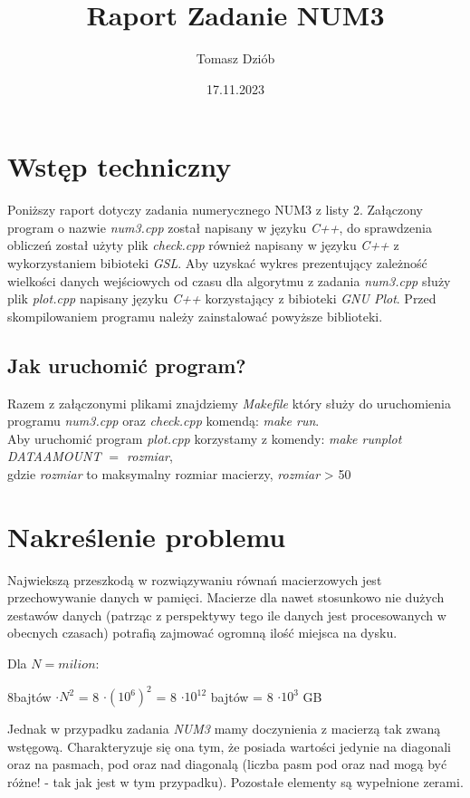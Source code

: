 \documentclass{article}
\title{Raport Zadanie NUM3}
\date{17.11.2023}
\author{Tomasz Dziób}
\begin{document}
  \maketitle
  \newpage
  \section{Wstęp techniczny}
  Poniższy raport dotyczy zadania numerycznego NUM3 z listy 2. Załączony program o nazwie \textit{num3.cpp} został napisany w języku \textit{C++}, do sprawdzenia obliczeń został użyty plik \textit{check.cpp} również napisany w języku \textit{C++} z wykorzystaniem bibioteki \textit{GSL}. Aby uzyskać wykres prezentujący zależność wielkości danych wejściowych od czasu dla algorytmu z zadania \textit{num3.cpp} służy plik \textit{plot.cpp} napisany języku \textit{C++} korzystający z bibioteki \textit{GNU Plot}. Przed skompilowaniem programu należy zainstalować powyższe biblioteki.

    \subsection{Jak uruchomić program?}
    Razem z załączonymi plikami znajdziemy \textit{Makefile} który służy do
    uruchomienia programu \textit{num3.cpp} oraz \textit{check.cpp} komendą: \textit{make run}.\\
    Aby uruchomić program \textit{plot.cpp} korzystamy z komendy: \textit{make runplot DATA\textunderscore AMOUNT $=$ rozmiar},\\
    gdzie \textit{rozmiar} to maksymalny rozmiar macierzy, \textit{rozmiar}  > 50

  \section{Nakreślenie problemu}
  Najwiekszą przeszkodą w rozwiązywaniu równań macierzowych jest przechowywanie danych w pamięci. Macierze dla nawet stosunkowo nie dużych zestawów danych (patrząc z perspektywy tego ile danych jest procesowanych w obecnych czasach) potrafią zajmować ogromną ilość miejsca na dysku.
  \begin{flushleft}
    Dla $N = milion$:
  \end{flushleft}

  \begin{center}
    8bajtów $\cdot N^2$ = 8 $\cdot (10^6)^2$ = 8 $\cdot 10^{12}$ bajtów = 8 $\cdot 10^3$ GB
  \end{center}
  Jednak w przypadku zadania \textit{NUM3} mamy doczynienia z macierzą tak zwaną wstęgową. Charakteryzuje się ona tym, że posiada wartości jedynie na diagonali oraz na pasmach, pod oraz nad diagonalą (liczba pasm pod oraz nad mogą być różne! - tak jak jest w tym przypadku). Pozostałe elementy są wypełnione zerami.
  
\end{document}
